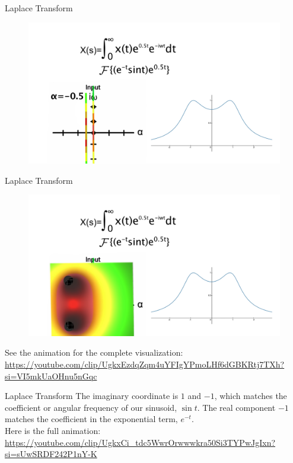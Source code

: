 \documentclass[11pt]{beamer}
\theoremstyle{plain}
\begin{document}
\begin{frame}{Laplace Transform}
    \begin{figure}
        \centering
        \includegraphics[width=1\linewidth]{Laplace_022_graph.png}
    \end{figure}  
\end{frame}

\begin{frame}{Laplace Transform}
    \begin{figure}
        \centering
        \includegraphics[width=1\linewidth]{Laplace_03_graph.png}
    \end{figure}
    See the animation for the complete visualization: \url{https://youtube.com/clip/UgkxEzdqZqm4uYFIgYPmoLHf6dGBKRtj7TXh?si=VI5mkUaOHnu5nGqc}
\end{frame}

\begin{frame}{Laplace Transform}
        The imaginary coordinate is $1$ and $-1$, which matches the coefficient or angular frequency of our sinusoid, $\sin t$. The real component $-1$ matches the coefficient in the exponential term, $e^{-t}$.\\
        Here is the full animation: \url{https://youtube.com/clip/UgkxCi_tdc5WwrOrwwwkra50Si3TYPwJgIxn?si=sUwSRDF242P1nY-K}
\end{frame}
\end{document}
